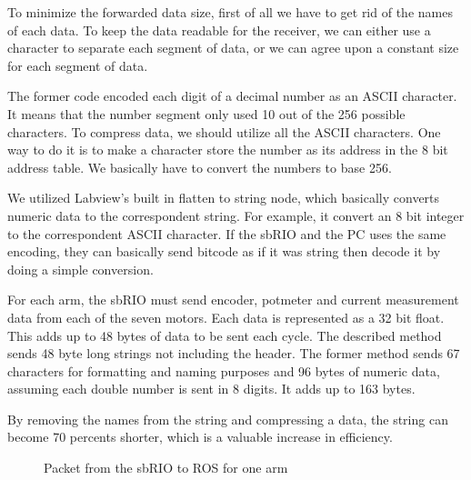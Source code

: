 To minimize the forwarded data size, first of all we have to get rid of the names of each data. To keep the data readable for the receiver, we can either use a character to separate each segment of data, or we can agree upon a constant size for each segment of data.

The former code encoded each digit of a decimal number as an ASCII character. It means that the number segment only used 10 out of the 256 possible characters. To compress data, we should utilize all the ASCII characters. One way to do it is to make a character store the number as its address in the 8 bit address table. We basically have to convert the numbers to base 256.

We utilized Labview's built in flatten to string node, which basically converts numeric data to the correspondent string. For example, it convert an 8 bit integer to the correspondent ASCII character. If the sbRIO and the PC uses the same encoding, they can basically send bitcode as if it was string then decode it by doing a simple conversion.
 

For each arm, the sbRIO must send encoder, potmeter and current measurement data from each of the seven motors. Each data is represented as a 32 bit float. This adds up to 48 bytes of data to be sent each cycle. The described method sends 48 byte long strings not including the header. The former method sends 67 characters for formatting and naming purposes and 96 bytes of numeric data, assuming each double number is sent in 8 digits. It adds up to 163 bytes.

By removing the names from the string and compressing a data, the string can become 70 percents shorter, which is a valuable increase in efficiency.

\begin{figure}[H]
\centering
{}
\caption{Packet from the sbRIO to ROS for one arm}
\label{received_packet}
\end{figure}

